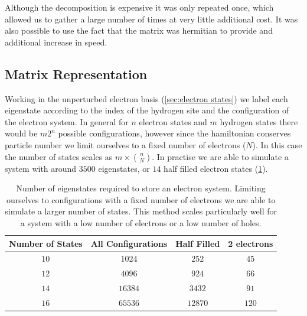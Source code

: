 Although the decomposition is
expensive it was only repeated once,
which allowed us to gather a large
number of times at very little additional
cost. It was also possible to use the
fact that the matrix was hermitian to
provide and additional increase in speed.

\subsection{Matrix Representation}\label{sec:state representation}
Working in the unperturbed electron basis
(\cref{sec:electron states})
we label each eigenstate
according to the index of the
hydrogen site and
the configuration of the
electron system.
In general for \(n\)
electron states
and \(m\) hydrogen states
there would
be \(m 2^n\)
possible configurations,
however since the hamiltonian
conserves particle number
we limit ourselves
to a fixed
number of electrons (\(N\)).
In this case the number
of states scales as \(m \times{} \binom{n}{N}\).
In practise we are able to
simulate a system with
around \(3500\) eigenstates,
or \(14\) half filled electron states
(\cref{tab:number of eigenstates}).
\begin{table}[htbp]
    \begin{center}
        \begin{tabular}{ *{4}{c} }
            \toprule
            Number of States & All Configurations & Half Filled & 2 electrons \\
            \midrule
            \(10\)           & \(1024\)           & \(252\)     & \(45\)      \\
            \(12\)           & \(4096\)           & \(924\)     & \(66\)      \\
            \(14\)           & \(16384\)          & \(3432\)    & \(91\)      \\
            \(16\)           & \(65536\)          & \(12870\)   & \(120\)     \\
            \bottomrule
        \end{tabular}
    \end{center}
    \caption{
        Number of eigenstates required
        to store an electron system.
        Limiting ourselves to
        configurations with a fixed
        number of electrons we are
        able to simulate a larger
        number of states.
        This method scales particularly
        well for a system with a
        low number of electrons
        or a low number of holes.
    }\label{tab:number of eigenstates}
\end{table}


